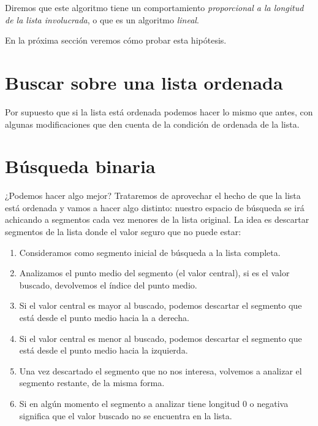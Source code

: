 Diremos que este algoritmo tiene un comportamiento {\it proporcional a la
longitud de la lista involucrada}, o que es un algoritmo {\it lineal}.

En la próxima sección veremos cómo probar esta hipótesis.

\section{Buscar sobre una lista ordenada}

Por supuesto que si la lista está ordenada podemos hacer lo mismo que antes,
con algunas modificaciones que den cuenta de la condición de ordenada de la
lista.


\section{Búsqueda binaria}

¿Podemos hacer algo mejor? Trataremos de aprovechar el hecho de que la lista
está ordenada y vamos a hacer algo distinto: nuestro espacio de búsqueda se
irá achicando a segmentos cada vez menores de la lista original.
La idea es descartar segmentos de la lista donde el valor seguro que no puede
estar:

\begin{enumerate}
\item Consideramos como segmento inicial de búsqueda a la lista completa.

\item Analizamos el punto medio del segmento (el valor central), si es el valor
buscado, devolvemos el índice del punto medio.

\item Si el valor central es mayor al buscado, podemos descartar el segmento
que está desde el punto medio hacia la a derecha.

\item Si el valor central es menor al buscado, podemos descartar el segmento
que está desde el punto medio hacia la izquierda.

\item Una vez descartado el segmento que no nos interesa, volvemos a analizar
el segmento restante, de la misma forma.

\item Si en algún momento el segmento a analizar tiene longitud 0 o negativa
significa que el valor buscado no se encuentra en la lista.
\end{enumerate}

